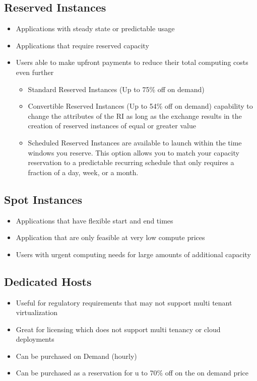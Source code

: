 \documentclass{article}
\begin{document}
\subsection{Reserved Instances}
\begin{itemize}
\item
Applications with steady state or predictable usage

\item
Applications that require reserved capacity

\item
Users able to make upfront payments to reduce their total computing costs even further
\begin{itemize}
	\item
	Standard Reserved Instances (Up to 75\% off on demand)
	
	\item
	Convertible Reserved Instances (Up to 54\% off on demand) capability to change the attributes of the RI as long as the exchange results in the creation of reserved instances of equal or greater value
	
	\item
	Scheduled Reserved Instances are available to launch within the time windows you reserve. This option allows you to match your capacity reservation to a predictable recurring schedule that only requires a fraction of a day, week, or a month.
\end{itemize}
\end{itemize}

\subsection{Spot Instances}
\begin{itemize}
\item
Applications that have flexible start and end times

\item
Application that are only feasible at very low compute prices

\item
Users with urgent computing needs for large amounts of additional capacity
\end{itemize}

\subsection{Dedicated Hosts}
\begin{itemize}
\item
Useful for regulatory requirements that may not support multi tenant virtualization

\item
Great for licensing which does not support multi tenancy or cloud deployments

\item
Can be purchased on Demand (hourly)

\item
Can be purchased as a reservation for u to 70\% off on the on demand price
\end{itemize}
\end{document}
